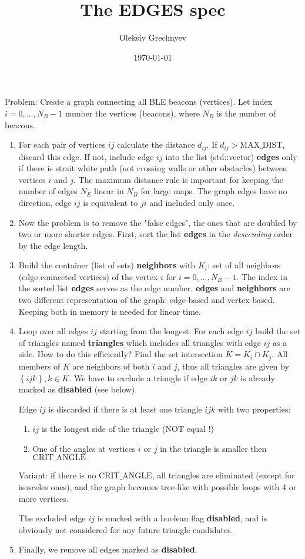 \documentclass{article}
\begin{document}
\title{The EDGES spec}
\author{Oleksiy Grechnyev}
\date{\today}
\maketitle

Problem: Create a graph connecting all BLE beacons (vertices).
Let index $i = 0, ..., N_B-1$ number the vertices (beacons), where $N_B$ is the number of beacons.

\begin{enumerate}[label=Step \arabic* :]
\item  For each pair of vertices $ij$ calculate the distance $d_{ij}$. If $d_{ij}>\mathrm{MAX\_DIST}$, 
discard this edge. If not, include edge $ij$ into the list (std::vector) \textbf{edges} only if there is strait
white path (not crossing walls or other obstacles) between vertices $i$ and $j$. The maximum distance
rule is important for keeping the number of edges $N_E$ linear in $N_B$ for large maps. The graph edges
have no direction, edge $ij$ is equivalent to $ji$ and included only once.
%
\item Now the problem is to remove the "false edges", the ones that are doubled by two or more shorter edges.
First, sort the list \textbf{edges} in the \emph{descending} order by the edge length.
%
\item Build the container (list of sets) \textbf{neighbors} with $K_i$: set of all neighbors (edge-connected
vertices) of the vertex $i$ for $i = 0, ..., N_B-1$. The index in the sorted list  \textbf{edges} serves
as the edge number. \textbf{edges} and \textbf{neighbors} are two different representation of the graph:
edge-based and vertex-based. Keeping both in memory is needed for linear time.
%
\item Loop over all edges $ij$ starting from the longest. For each edge $ij$ build the set of triangles named
\textbf{triangles} which includes all triangles with edge $ij$ as a side. How to do this efficiently?
Find the set intersection $K = K_i \cap K_j$. All members of $K$ are neighbors of both $i$ and $j$,
thus all triangles are given by $\left\{ijk\right\}, k \in K$. We have to exclude a triangle if edge $ik$
or $jk$ is already marked as \textbf{disabled} (see below).

Edge $ij$ is discarded if there is at least one triangle $ijk$ with two properties:
\begin{enumerate}
\item $ij$ is the longest side of the triangle (NOT equal !)
\item One of the angles at vertices $i$ or $j$ in the triangle is smaller then $\mathrm{CRIT\_ANGLE}$
\end{enumerate}
Variant: if there is no $\mathrm{CRIT\_ANGLE}$, all triangles are eliminated (except for isosceles ones),
and the graph becomes tree-like with possible loops with 4 or more vertices.

The excluded edge $ij$ is marked with a boolean flag \textbf{disabled}, 
and is obviously not considered for any future triangle candidates.
%
\item Finally, we remove all edges marked as \textbf{disabled}.
\end{enumerate}
\end{document}
